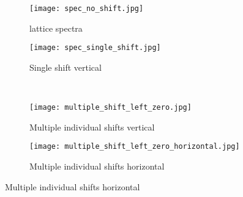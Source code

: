 


\begin{figure}[t!]%
    \centering
    \begin{subfigure}{.47\textwidth}
        \centering
        \texttt{[image: spec\_no\_shift.jpg]}
        \caption{lattice spectra}
        \label{fig:lattice_spectra}
    \end{subfigure}\quad
    \begin{subfigure}{.47\textwidth}
        \centering
        \texttt{[image: spec\_single\_shift.jpg]}
        \caption{Single shift vertical}
        \label{fig:single_shift_vertical}
    \end{subfigure}\\
    \begin{subfigure}{.47\textwidth}
        \centering
        \texttt{[image: multiple\_shift\_left\_zero.jpg]}
        \caption{Multiple individual shifts vertical}
        \label{fig:multiple_shift_vertical}
    \end{subfigure}\quad
    \begin{subfigure}{.47\textwidth}
        \centering
        \texttt{[image: multiple\_shift\_left\_zero\_horizontal.jpg]}
        \caption{Multiple individual shifts horizontal}
        \label{fig:multiple_shift_horizontal}
    \end{subfigure}
\end{figure}
